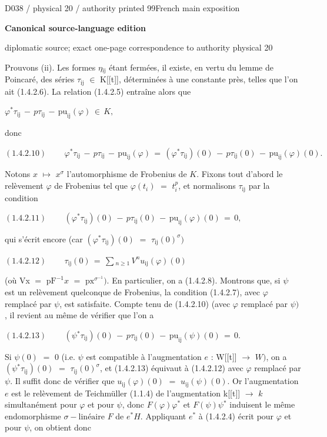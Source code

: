 \documentclass[9pt]{article}
\newcommand{\CanonText}[1]{\par{\fontsize{8.0}{9.35}\selectfont\RaggedRight #1\par}\vspace{2.2pt}}
\newcommand{\CanonDisplay}[1]{\par\vspace{1.2pt}\begin{center}{\fontsize{7.2}{8.4}\selectfont\(\displaystyle #1\)}\end{center}\vspace{1.2pt}}
\newcommand{\LayerTitle}{Canonical source-language edition}
\begin{document}
\noindent\begin{minipage}[t][\dimexpr\textheight-5pt\relax][t]{\textwidth}
{\sffamily\fontsize{7.3}{8.2}\selectfont\color{Quiet} D038 / physical 20 / authority printed 99\hfill French main exposition}
\par{}\vspace{4.5pt}
{\sffamily\fontsize{10.4}{11.6}\selectfont\bfseries\color{Accent} \LayerTitle}
\par{\sffamily\fontsize{6.7}{7.7}\selectfont\color{Quiet} diplomatic source; exact one-page correspondence to authority physical 20}
\vspace{5pt}
\CanonText{Prouvons (ii). Les formes \(\eta{}_{\mathrm{ij}}\) étant fermées, il existe, en vertu du lemme de Poincaré, des séries \(\tau{}_{\mathrm{ij}}\) \(\in{}\) K[[t]], déterminées à une constante près, telles que l'on ait (1.4.2.6). La relation (1.4.2.5) entraîne alors que}
\CanonDisplay{\varphi{}^{*}\tau{}_{\mathrm{ij}}\,-\,p\tau{}_{\mathrm{ij}}\,-\,\text{pu}_{\mathrm{ij}}(\varphi{})\,\in{}\,K,}
\CanonText{donc}
\CanonDisplay{(1.4.2.10)\qquad\,\varphi{}^{*}\tau{}_{\mathrm{ij}}\,-\,p\tau{}_{\mathrm{ij}}\,-\,\text{pu}_{\mathrm{ij}}(\varphi{})\,=\,(\varphi{}^{*}\tau{}_{\mathrm{ij}})(0)\,-\,p\tau{}_{\mathrm{ij}}(0)\,-\,\text{pu}_{\mathrm{ij}}(\varphi{})(0).}
\CanonText{Notons \(x\) \(\mapsto{}\) \(x^\sigma{}\) l'automorphisme de Frobenius de \(K\). Fixons tout d'abord le relèvement \(\varphi{}\) de Frobenius tel que \(\varphi{}(t_{i})\) \(=\) \(t_{i}^{p}\), et normalisons \(\tau{}_{\mathrm{ij}}\) par la condition}
\CanonDisplay{(1.4.2.11)\qquad\,(\varphi{}^{*}\tau{}_{\mathrm{ij}})(0)\,-\,p\tau{}_{\mathrm{ij}}(0)\,-\,\text{pu}_{\mathrm{ij}}(\varphi{})(0)\,=\,0,}
\CanonText{qui s'écrit encore (car \((\varphi{}^{*}\tau{}_{\mathrm{ij}})(0)\) \(=\) \(\tau{}_{\mathrm{ij}}(0)^\sigma{})\)}
\CanonDisplay{(1.4.2.12)\qquad\,\tau{}_{\mathrm{ij}}(0)\,=\,\sum{}_{n\geq{}1}\,V^{n}u_{\mathrm{ij}}(\varphi{})(0)}
\CanonText{(où Vx \(=\) \(\text{pF}^{-1}x\) \(=\) \(\text{px}^{\sigma{}^{-1}})\). En particulier, on a (1.4.2.8). Montrons que, si \(\psi{}\) est un relèvement quelconque de Frobenius, la condition (1.4.2.7), avec \(\varphi{}\) remplacé par \(\psi{}\), est satisfaite. Compte tenu de (1.4.2.10) (avec \(\varphi{}\) remplacé par \(\psi{})\), il revient au même de vérifier que l'on a}
\CanonDisplay{(1.4.2.13)\qquad\,(\psi{}^{*}\tau{}_{\mathrm{ij}})(0)\,-\,p\tau{}_{\mathrm{ij}}(0)\,-\,\text{pu}_{\mathrm{ij}}(\psi{})(0)\,=\,0.}
\CanonText{Si \(\psi{}(0)\) \(=\) 0 (i.e. \(\psi{}\) est compatible à l'augmentation \(e\) : W[[t]] \(\to{}\) \(W)\), on a \((\psi{}^{*}\tau{}_{\mathrm{ij}})(0)\) \(=\) \(\tau{}_{\mathrm{ij}}(0)^\sigma{}\), et (1.4.2.13) équivaut à (1.4.2.12) avec \(\varphi{}\) remplacé par \(\psi{}\). Il suffit donc de vérifier que \(u_{\mathrm{ij}}(\varphi{})(0)\) \(=\) \(u_{\mathrm{ij}}(\psi{})(0)\). Or l'augmentation \(e\) est le relèvement de Teichmüller (1.1.4) de l'augmentation k[[t]] \(\to{}\) \(k\) simultanément pour \(\varphi{}\) et pour \(\psi{}\), donc \(F(\varphi{})\varphi{}^{*}\) et \(F(\psi{})\psi{}^{*}\) induisent le même endomorphisme \(\sigma{}-\text{linéaire}\) \(F\) de \(e^{*}H\). Appliquant \(e^{*}\) à (1.4.2.4) écrit pour \(\varphi{}\) et pour \(\psi{}\), on obtient donc}

\end{minipage}
\end{document}
